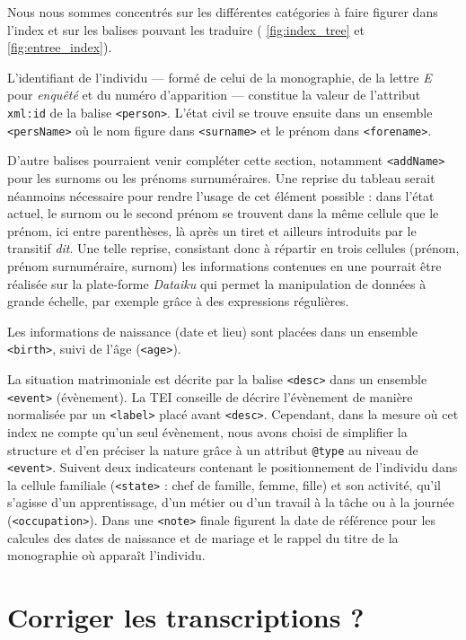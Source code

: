Nous nous sommes concentrés sur les différentes catégories à faire figurer dans l'index et sur les balises pouvant les traduire (\fig{} \ref{fig:index_tree} et \ref{fig:entree_index}).

L'identifiant de l'individu --- formé de celui de la monographie, de la lettre \textit{E} pour \textit{enquêté} et du numéro d'apparition --- constitue la valeur de l'attribut \texttt{xml:id} de la balise \texttt{<person>}. L'état civil se trouve ensuite dans un ensemble \texttt{<persName>} où le nom figure dans \texttt{<surname>} et le prénom dans \texttt{<forename>}.

D'autre balises pourraient venir compléter cette section, notamment \texttt{<addName>} pour les surnoms ou les prénoms surnuméraires. Une reprise du tableau serait néanmoins nécessaire pour rendre l'usage de cet élément possible : dans l'état actuel, le surnom ou le second prénom se trouvent dans la même cellule que le prénom, ici entre parenthèses, là après un tiret et ailleurs introduits par le transitif \textit{dit}. Une telle reprise, consistant donc à répartir en trois cellules (prénom, prénom surnuméraire, surnom) les informations contenues en une pourrait être réalisée sur la plate-forme \textit{Dataiku} qui permet la manipulation de données à grande échelle, par exemple grâce à des expressions régulières.

Les informations de naissance (date et lieu) sont placées dans un ensemble \texttt{<birth>}, suivi de l'âge (\texttt{<age>}).

La situation matrimoniale est décrite par la balise \texttt{<desc>} dans un ensemble \texttt{<event>} (évènement). La TEI conseille de décrire l'évènement de manière normalisée par un \texttt{<label>} placé avant \texttt{<desc>}. Cependant, dans la mesure où cet index ne compte qu'un seul évènement, nous avons choisi de simplifier la structure et d'en préciser la nature grâce à un attribut \texttt{@type} au niveau de \texttt{<event>}. Suivent deux indicateurs contenant le positionnement de l'individu dans la cellule familiale (\texttt{<state>} : chef de famille, femme, fille) et son activité, qu'il s'agisse d'un apprentissage, d'un métier ou d'un travail à la tâche ou à la journée (\texttt{<occupation>}). Dans une \texttt{<note>} finale figurent la date de référence pour les calcules des dates de naissance et de mariage et le rappel du titre de la monographie où apparaît l'individu.

\section{Corriger les transcriptions ?}

